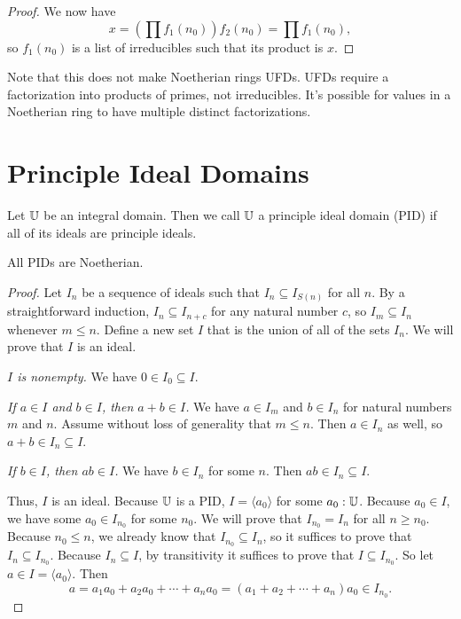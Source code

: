 \documentclass[../../math.tex]{subfiles}
\begin{document}
\begin{proof}
    We now have
    \[
        x = (\prod f_1(n_0)) f_2(n_0) = \prod f_1(n_0),
    \]
    so $f_1(n_0)$ is a list of irreducibles such that its product is $x$.
\end{proof}

Note that this does not make Noetherian rings UFDs.  UFDs require a
factorization into products of primes, not irreducibles.  It's possible for
values in a Noetherian ring to have multiple distinct factorizations.

\section{Principle Ideal Domains}

\begin{class}
    Let $\mathbb{U}$ be an integral domain.  Then we call $\mathbb{U}$ a principle ideal domain
    (PID) if all of its ideals are principle ideals.
\end{class}

\begin{instance}
    All PIDs are Noetherian.
\end{instance}
\begin{proof}
    Let $I_n$ be a sequence of ideals such that $I_n \subseteq I_{S(n)}$ for all
    $n$.  By a straightforward induction, $I_n \subseteq I_{n + c}$ for any
    natural number $c$, so $I_m \subseteq I_n$ whenever $m \leq n$.  Define a
    new set $I$ that is the union of all of the sets $I_n$.  We will prove that
    $I$ is an ideal.

    \textit{$I$ is nonempty.}  We have $0 \in I_0 \subseteq I$.

    \textit{If $a \in I$ and $b \in I$, then $a + b \in I$.}  We have $a \in
    I_m$ and $b \in I_n$ for natural numbers $m$ and $n$.  Assume without loss
    of generality that $m \leq n$.  Then $a \in I_n$ as well, so $a + b \in I_n
    \subseteq I$.

    \textit{If $b \in I$, then $ab \in I$.}  We have $b \in I_n$ for some $n$.
    Then $ab \in I_n \subseteq I$.

    Thus, $I$ is an ideal.  Because $\mathbb{U}$ is a PID, $I = \langle a_0 \rangle$ for
    some $a_0 : \mathbb{U}$.  Because $a_0 \in I$, we have some $a_0 \in I_{n_0}$ for
    some $n_0$.  We will prove that $I_{n_0} = I_n$ for all $n \geq n_0$.
    Because $n_0 \leq n$, we already know that $I_{n_0} \subseteq I_n$, so it
    suffices to prove that $I_n \subseteq I_{n_0}$.  Because $I_n \subseteq I$,
    by transitivity it suffices to prove that $I \subseteq I_{n_0}$.  So let $a
    \in I = \langle a_0 \rangle$.  Then
    \[
        a = a_1 a_0 + a_2 a_0 + \cdots + a_n a_0 = (a_1 + a_2 + \cdots + a_n)a_0
        \in I_{n_0}.
    \]
\end{proof}
\end{document}
